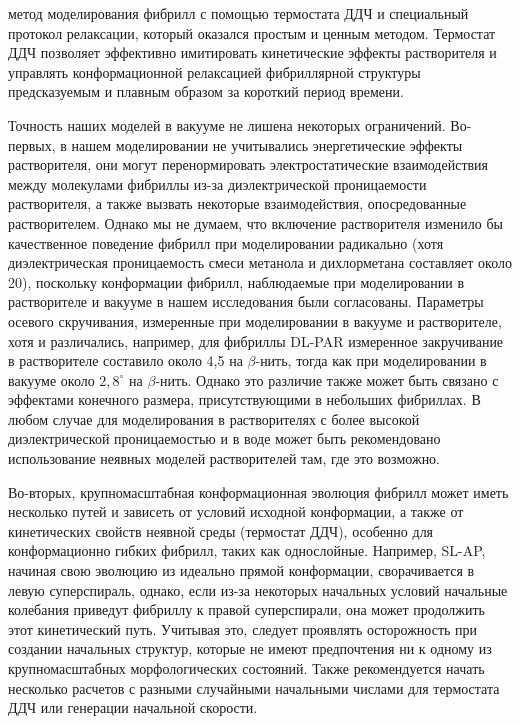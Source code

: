 метод моделирования фибрилл с помощью термостата ДДЧ и специальный протокол релаксации, который оказался простым и ценным методом. Термостат ДДЧ позволяет эффективно имитировать кинетические эффекты растворителя и управлять конформационной релаксацией фибриллярной структуры предсказуемым и плавным образом за короткий период времени.
    
    Точность наших моделей в вакууме не лишена некоторых ограничений. Во-первых, в нашем моделировании не учитывались энергетические эффекты растворителя, они могут перенормировать электростатические взаимодействия между молекулами фибриллы из-за диэлектрической проницаемости растворителя, а также вызвать некоторые взаимодействия, опосредованные растворителем. Однако мы не думаем, что включение растворителя изменило бы качественное поведение фибрилл при моделировании радикально (хотя диэлектрическая проницаемость смеси метанола и дихлорметана составляет около 20), поскольку конформации фибрилл, наблюдаемые при моделировании в растворителе и вакууме в нашем исследования были согласованы. Параметры осевого скручивания, измеренные при моделировании в вакууме и растворителе, хотя и различались, например, для фибриллы DL-PAR измеренное закручивание в растворителе составило около 4,5 на $\beta$-нить, тогда как при моделировании в вакууме около $2,8^{\circ}$ на $\beta$-нить. Однако это различие также может быть связано с эффектами конечного размера, присутствующими в небольших фибриллах. В любом случае для моделирования в растворителях с более высокой диэлектрической проницаемостью и в воде может быть рекомендовано использование неявных моделей растворителей там, где это возможно.
    
    Во-вторых, крупномасштабная конформационная эволюция фибрилл может иметь несколько путей и зависеть от условий исходной конформации, а также от кинетических свойств неявной среды (термостат ДДЧ), особенно для конформационно гибких фибрилл, таких как однослойные. Например, SL-AP, начиная свою эволюцию из идеально прямой конформации, сворачивается в левую суперспираль, однако, если из-за некоторых начальных условий начальные колебания приведут фибриллу к правой суперспирали, она может продолжить этот кинетический путь. Учитывая это, следует проявлять осторожность при создании начальных структур, которые не имеют предпочтения ни к одному из крупномасштабных морфологических состояний. Также рекомендуется начать несколько расчетов с разными случайными начальными числами для термостата ДДЧ или генерации начальной скорости.
    
